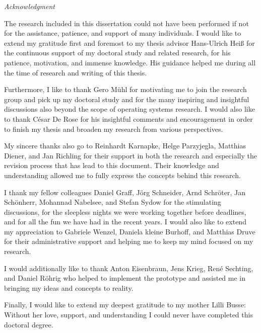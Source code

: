 \vspace*{1cm}
\begin{center}
\begin{minipage}{0.8\textwidth}

\setlength\parindent{12pt}

\begin{center}
\textit{\LARGE Acknowledgment}
\end{center} \vspace{0.5cm}

The research included in this dissertation could not have been performed if not for the assistance, patience, and support of many individuals. I would like to extend my gratitude first and foremost to my thesis advisor Hans-Ulrich Heiß for the continuous support of my doctoral study and related research, for his patience, motivation, and immense knowledge. His guidance helped me during all the time of research and writing of this thesis. 

Furthermore, I like to thank Gero M\"{u}hl for motivating me to join the research group and pick up my doctoral study and for the many inspiring and insightful discussions also beyond the scope of operating systems research. I would also like to thank C\'{e}sar De Rose for his insightful comments and encouragement in order to finish my thesis and broaden my research from various perspectives.

My sincere thanks also go to Reinhardt Karnapke, Helge Parzyjegla, Matthias Diener, and Jan Richling for their support in both the research and especially the revision process that has lead to this document. Their knowledge and understanding allowed me to fully express the concepts behind this research.

I thank my fellow colleagues Daniel Graff, J\"{o}rg Schneider, Arnd Schr\"{o}ter, Jan Sch\"{o}nherr, Mohannad Nabelsee, and Stefan Sydow for the stimulating discussions, for the sleepless nights we were working together before deadlines, and for all the fun we have had in the recent years. I would also like to extend my appreciation to Gabriele Wenzel, Daniela kleine Burhoff, and Matthias Druve for their administrative support and helping me to keep my mind focused on my research.

I would additionally like to thank Anton Eisenbraun, Jens Krieg, René Sechting, and Daniel R\"{o}hrig who helped to implement the prototype and assisted me in bringing my ideas and concepts to reality.

Finally, I would like to extend my deepest gratitude to my mother Lilli Busse: Without her love, support, and understanding I could never have completed this doctoral degree.

\setlength\parindent{0pt}

\end{minipage}
\end{center}